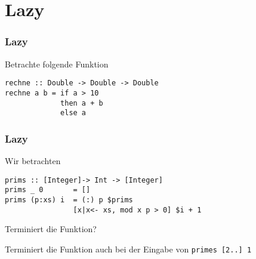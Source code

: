\subtitle{Tag vier - ein bisschen noch} 
\date{27.03.2014}

\begin{frame}[plain]
\titlepage
\end{frame}

\section{Lazy}
\begin{frame}[fragile]
\frametitle{Lazy}
\begin{block}{Betrachte folgende Funktion}
\begin{lstlisting}
rechne :: Double -> Double -> Double
rechne a b = if a > 10 
             then a + b
             else a
\end{lstlisting}
\end{block}
\end{frame}


\begin{frame}[fragile]
\frametitle{Lazy}
\begin{block}{Wir betrachten}
\begin{lstlisting}
prims :: [Integer]-> Int -> [Integer]
prims _ 0 		= []
prims (p:xs) i 	= (:) p $prims 
                [x|x<- xs, mod x p > 0] $i + 1
\end{lstlisting}
Terminiert die Funktion?
\end{block}
\pause 
\begin{block}{Terminiert die Funktion auch bei der Eingabe von}
\lstinline|primes [2..] 1|
\end{block}
\end{frame}



